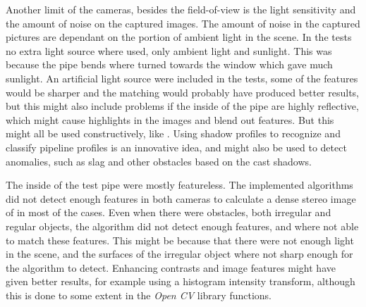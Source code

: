 Another limit of the cameras, besides the field-of-view is the light sensitivity and
the amount of noise on the captured images. The amount of noise in the captured pictures
are dependant on the portion of ambient light in the scene. In the tests no extra
light source where used, only ambient light and sunlight. This was because
the pipe bends where turned towards the window which gave much sunlight. An artificial
light source were included in the tests, some of the features would be sharper and the
matching would probably have produced better results, but this might also include problems if the
inside of the pipe are highly reflective, which might cause highlights in the images and 
blend out features. But this might all be used constructively, like \cite{MRINSPECT-V}.
Using shadow profiles to recognize and classify pipeline profiles is an innovative idea,
and might also be used to detect anomalies, such as slag and other obstacles based on the
cast shadows.

The inside of the test pipe were mostly featureless. The implemented algorithms did not
detect enough features in both cameras to calculate a dense stereo image of in most of the
cases. Even when there were obstacles, both irregular and regular objects, the algorithm did not
detect enough features, and where not able to match these features. This might be because
that there were not enough light in the scene, and the surfaces of the irregular object
where not sharp enough for the algorithm to detect. Enhancing contrasts and image features
might have given better results, for example using a histogram intensity transform,
although this is done to some extent in the \emph{Open CV} library functions. \cite{gonzalez} 

